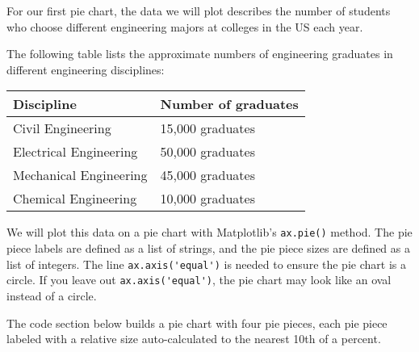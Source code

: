 \documentclass{book}
\newcommand{\passthrough}[1]{#1}
\begin{document}
For our first pie chart, the data we will plot describes the number of
students who choose different engineering majors at colleges in the US
each year.

The following table lists the approximate numbers of engineering
graduates in different engineering disciplines:

\begin{longtable}[]{@{}ll@{}}
\toprule
Discipline & Number of graduates\tabularnewline
\midrule
\endhead
Civil Engineering & 15,000 graduates\tabularnewline
Electrical Engineering & 50,000 graduates\tabularnewline
Mechanical Engineering & 45,000 graduates\tabularnewline
Chemical Engineering & 10,000 graduates\tabularnewline
\bottomrule
\end{longtable}

We will plot this data on a pie chart with Matplotlib's
\passthrough{\lstinline!ax.pie()!} method. The pie piece labels are
defined as a list of strings, and the pie piece sizes are defined as a
list of integers. The line \passthrough{\lstinline!ax.axis('equal')!} is
needed to ensure the pie chart is a circle. If you leave out
\passthrough{\lstinline!ax.axis('equal')!}, the pie chart may look like
an oval instead of a circle.

The code section below builds a pie chart with four pie pieces, each pie
piece labeled with a relative size auto-calculated to the nearest 10th
of a percent.
    
\end{document}
